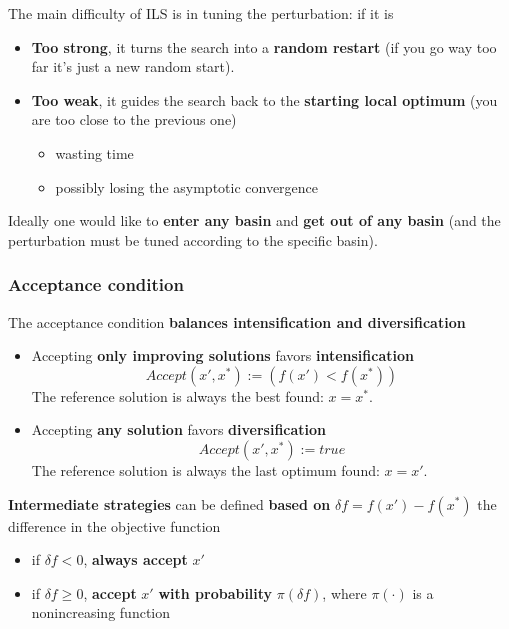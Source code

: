 The main difficulty of ILS is in tuning the perturbation: if it is
\begin{itemize}
	\item \textbf{Too strong}, it turns the search into a \textbf{random restart} (if you go way too far it's just a new random start).\\
	
	\item \textbf{Too weak}, it guides the search back to the \textbf{starting local optimum} (you are too close to the previous one)
	\begin{itemize}
		\item wasting time
		\item possibly losing the asymptotic convergence
	\end{itemize}
	\nn
\end{itemize}

Ideally one would like to \textbf{enter any basin} and \textbf{get out of any basin} (and the perturbation must be tuned according to the specific basin).\\

\newpage

\subsubsection{Acceptance condition}
The acceptance condition \textbf{balances intensification and diversification}
\begin{itemize}
	\item Accepting \textbf{only improving solutions} favors \textbf{intensification}
	$$Accept(x', x^\ast) := (f (x') < f (x^\ast))$$
	The reference solution is always the best found: $x = x^\ast$.\\
	
	\item Accepting \textbf{any solution} favors \textbf{diversification}
	$$ Accept(x', x^\ast) := true $$
	The reference solution is always the last optimum found: $x = x'$.\\
\end{itemize}

\textbf{Intermediate strategies} can be defined \textbf{based on} $\delta f = f (x') - f (x^\ast)$ the difference in the objective function
\begin{itemize}
	\item if $\delta f < 0$, \textbf{always accept} $x'$
	
	\item if $\delta f \geq 0$, \textbf{accept} $x'$ \textbf{with probability} $\pi (\delta f)$, where $\pi (\cdot)$ is a nonincreasing function
\end{itemize}

